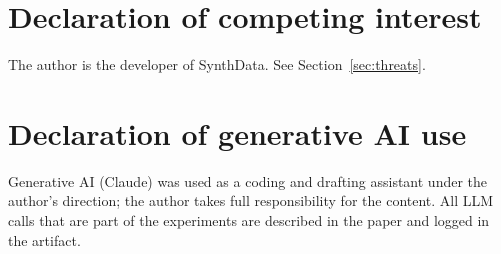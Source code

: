\documentclass[preprint,12pt]{elsarticle}
\begin{document}
\section*{Declaration of competing interest}
The author is the developer of SynthData. See Section~\ref{sec:threats}.

\section*{Declaration of generative AI use}
Generative AI (Claude) was used as a coding and drafting assistant under the author's direction; the author takes full responsibility for the content. All LLM calls that are part of the experiments are described in the paper and logged in the artifact.



\end{document}
